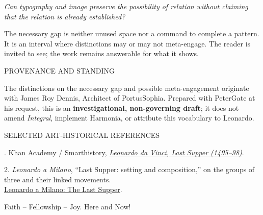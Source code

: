 \documentclass[11pt]{article}
\newcommand{\ruleline}{\par\vspace{.13in}{\color{gold}\rule{.48in}{.9pt}}\par\vspace{.14in}}
\newcommand{\qline}[1]{\begin{center}\begin{minipage}{.88\linewidth}\centering\color{deep}\fontsize{14}{17}\selectfont\itshape #1\end{minipage}\end{center}}
\newcommand{\notelabel}[1]{{\sffamily\fontsize{8}{9}\selectfont\color{gold}\MakeUppercase{#1}}}
\begin{document}
\vspace{.08in}
\qline{Can typography and image preserve the possibility of relation without claiming that the relation is already established?}
\vspace{.05in}
The necessary gap is neither unused space nor a command to complete a pattern. It is an interval where distinctions may or may not meta-engage. The reader is invited to see; the work remains answerable for what it shows.

\ruleline
\notelabel{Provenance and standing}\par
{\fontsize{9.5}{11.5}\selectfont The distinctions on the necessary gap and possible meta-engagement originate with James Roy Dennis, Architect of PortusSophia\texttrademark. Prepared with PeterGate at his request, this is an \textbf{investigational, non-governing draft}; it does not amend \textit{Integral}, implement Harmonia, or attribute this vocabulary to Leonardo.\par}
\vspace{.09in}
\notelabel{Selected art-historical references}\par
{\fontsize{8.2}{9.5}. Khan Academy / Smarthistory, \href{https://www.khanacademy.org/humanities/art-history/renaissance-reformation/high-ren-florence-rome/leonardo-da-vinci/v/leonardo-da-vinci-last-supper-1495-98}{\textit{Leonardo da Vinci, Last Supper (1495--98)}}.\par
2. \textit{Leonardo a Milano}, ``Last Supper: setting and composition,'' on the groups of three and their linked movements.\\
\href{https://www.leonardoamilano.org/english/last_supper.php}{Leonardo a Milano: The Last Supper}.\par}
\vspace{.10in}
{\sffamily\fontsize{9}{11}\selectfont\color{sea} Faith -- Fellowship -- Joy.  Here and Now!\par}
\end{document}
